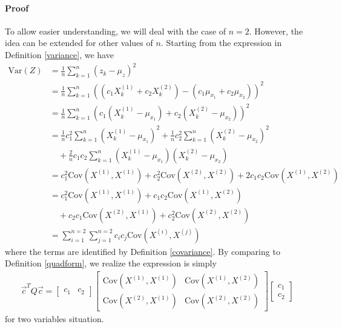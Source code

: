 \begin{proper}
\paragraph{Proof} To allow easier understanding, we will deal with the case of $n = 2$. However, the idea can be extended for other values of $n$. Starting from the expression in Definition \ref{variance}, we have
\begin{align*}
\text{Var}(Z) &= \frac{1}{n} \sum_{k=1}^n (z_k - \mu_z)^2 \\
&= \frac{1}{n} \sum_{k=1}^n ((c_1X^{(1)}_k + c_2X^{(2)}_k) - (c_1\mu_{x_1} + c_2\mu_{x_2}))^2 \\
&= \frac{1}{n} \sum_{k=1}^n (c_1(X^{(1)}_k - \mu_{x_1}) + c_2(X^{(2)}_k - \mu_{x_2}))^2 \\
&= \frac{1}{n} c_1^2 \sum_{k=1}^n (X^{(1)}_k - \mu_{x_1})^2 + \frac{1}{n} c_2^2 \sum_{k=1}^n (X^{(2)}_k - \mu_{x_2})^2 \\
&\quad+ \frac{2}{n} c_1c_2 \sum_{k=1}^n (X^{(1)}_k - \mu_{x_1}) (X^{(2)}_k - \mu_{x_2}) \\
&= c_1^2 \text{Cov}(X^{(1)}, X^{(1)}) + c_2^2 \text{Cov}(X^{(2)}, X^{(2)}) + 2c_1c_2 \text{Cov}(X^{(1)}, X^{(2)}) \\
&= c_1^2 \text{Cov}(X^{(1)}, X^{(1)}) + c_1c_2 \text{Cov}(X^{(1)}, X^{(2)}) \\
&\quad + c_2c_1 \text{Cov}(X^{(2)}, X^{(1)}) + c_2^2 \text{Cov}(X^{(2)}, X^{(2)}) \\
&= \sum_{i=1}^{n=2}\sum_{j=1}^{n=2} c_ic_j\text{Cov}(X^{(i)}, X^{(j)})
\end{align*}
where the terms are identified by Definition \ref{covariance}. By comparing to Definition \ref{quadform}, we realize the expression is simply
\begin{align*}
\vec{c}^TQ\vec{c} =
\begin{bmatrix}
c_1 & c_2
\end{bmatrix}
\begin{bmatrix}
\text{Cov}(X^{(1)}, X^{(1)}) & \text{Cov}(X^{(1)}, X^{(2)}) \\
\text{Cov}(X^{(2)}, X^{(1)}) & \text{Cov}(X^{(2)}, X^{(2)}) 
\end{bmatrix}
\begin{bmatrix}
c_1 \\
c_2
\end{bmatrix}
\end{align*}
for two variables situation.
\end{proper}

